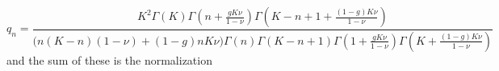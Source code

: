 \begin{equation*}%
q_n = \frac{ K^2\Gamma(K) \Gamma\left(n+\frac{g K\nu}{1-\nu}\right) \Gamma\left(K-n+1+\frac{(1-g) K\nu}{1-\nu}\right) }{ \big(n(K-n)(1-\nu)+(1-g)n K\nu\big) \Gamma(n) \Gamma(K-n+1) \Gamma\left(1+\frac{g K\nu}{1-\nu}\right) \Gamma\left(K+\frac{(1-g) K\nu}{1-\nu}\right)}
\end{equation*}
and the sum of these is the normalization
